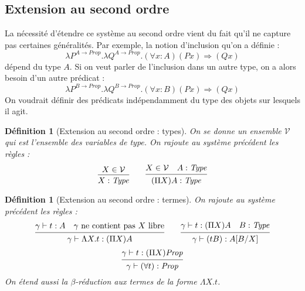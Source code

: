 \documentclass[a4paper,12pt]{article}
\theoremstyle{plain}
\newtheorem{defi}[theo]{Définition}
\begin{document}
\subsection{Extension au second ordre}

La nécessité d'étendre ce système au second ordre vient du fait qu'il ne capture pas certaines généralités. Par exemple, la notion d'inclusion qu'on a définie :
$$\lambda P^{A \to \mathit{Prop}}. \lambda Q^{A \to \mathit{Prop}}. (\forall x:A) (P x) \Rightarrow(Qx)$$
dépend du type $A$. Si on veut parler de l'inclusion dans un autre type, on a alors besoin d'un autre prédicat :
$$\lambda P^{B \to \mathit{Prop}}. \lambda Q^{B \to \mathit{Prop}}. (\forall x:B) (P x) \Rightarrow(Qx)$$
On voudrait définir des prédicats indépendamment du type des objets sur lesquels il agit.

\begin{defi}[Extension au second ordre : types]
On se donne un ensemble $\mathcal{V}$ qui est l'ensemble des variables de type. On rajoute au système précédent les règles :
$$
\begin{prooftree}[center = false]
\hypo{X \in \mathcal{V}}
\infer1{X : \mathit{Type}}
\end{prooftree}
\qquad
\begin{prooftree}[center = false]
\hypo{X \in \mathcal{V} \quad A: \mathit{Type}}
\infer1{(\Pi X) A : \mathit{Type}}
\end{prooftree}
$$
\end{defi}

\begin{defi}[Extension au second ordre : termes]
On rajoute au système précédent les règles :
$$
\begin{prooftree}[center = false]
\hypo{\gamma \vdash t : A \quad \gamma \text{ ne contient pas } X \text{ libre}}
\infer1{\gamma \vdash \Lambda X.t : (\Pi X) A}
\end{prooftree}
\qquad
\begin{prooftree}[center = false]
\hypo{\gamma \vdash t : (\Pi X) A \quad B : \mathit{Type}}
\infer1{\gamma \vdash (t B) : A[B/X]}
\end{prooftree}
$$
$$
\begin{prooftree}[center = false]
\hypo{\gamma \vdash t : (\Pi X) \mathit{Prop}}
\infer1{\gamma \vdash (\forall t): \mathit{Prop}}
\end{prooftree}
$$
On étend aussi la $\beta$-réduction aux termes de la forme $\Lambda X.t$.
\end{defi}
\end{document}
